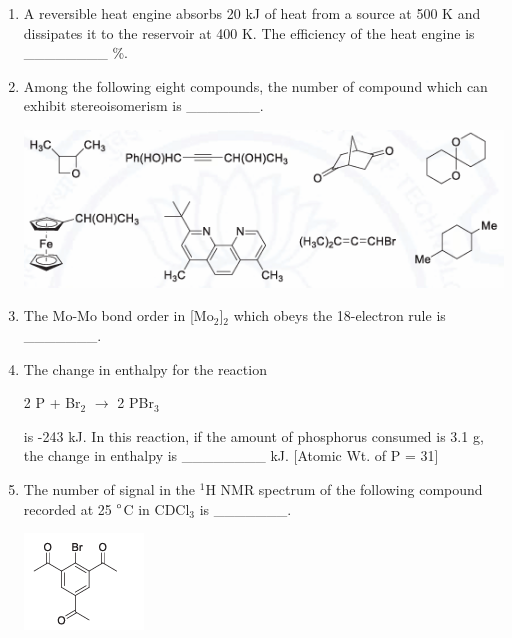 \documentclass[journal,12pt,onecolumn]{IEEEtran}
\begin{document}
\begin{enumerate}
    \item A reversible heat engine absorbs 20 kJ of heat from a source at 500 K and dissipates it to the reservoir at 400 K. The efficiency of the heat engine is \_\_\_\_\_\_\_\_ \%.
    \hfill{}

    \item Among the following eight compounds, the number of compound which can exhibit stereoisomerism is \_\_\_\_\_\_\_.
    \begin{center}
    \includegraphics[width=0.8\columnwidth]{figs/q30.png}
    \end{center}
    \hfill{}
 \item The Mo-Mo bond order in [Mo$_2$]$_2$ which obeys the 18-electron rule is \_\_\_\_\_\_\_.
    \hfill{}

    \item The change in enthalpy  for the reaction
    \begin{center}
        2 P  +  Br$_2$  $\rightarrow$ 2 PBr$_3$ 
    \end{center}
    is -243 kJ. In this reaction, if the amount of phosphorus consumed is 3.1 g, the change in enthalpy  is \_\_\_\_\_\_\_\_ kJ. [Atomic Wt. of P = 31]
    \hfill{}

    \item The number of signal in the $^1$H NMR spectrum of the following compound recorded at 25 $\degree$C in CDCl$_3$ is \_\_\_\_\_\_\_.
    \begin{center}
    \includegraphics[width=0.25\columnwidth]{figs/q33.png}
    \end{center}
    \hfill{}


\end{enumerate}
\end{document}
